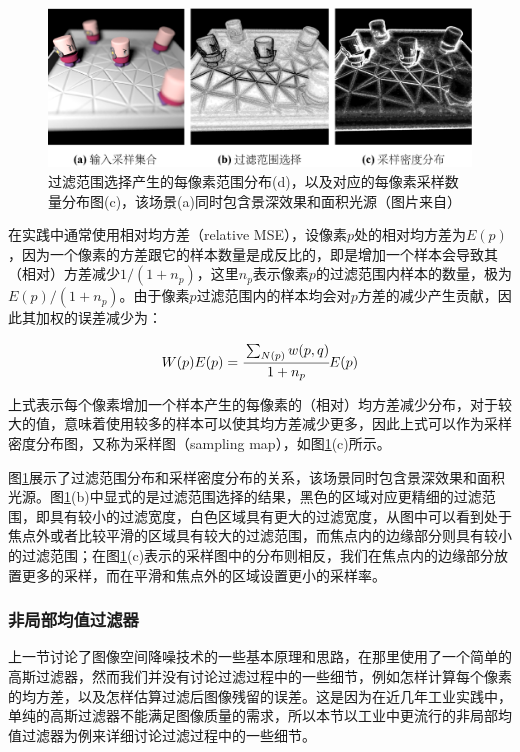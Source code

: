 \begin{figure}
	\includegraphics[width=1.0\textwidth]{figures/pt/denoising-results}
	\caption{过滤范围选择产生的每像素范围分布(d)，以及对应的每像素采样数量分布图(c)，该场景(a)同时包含景深效果和面积光源（图片来自\cite{a:AdaptiveRenderingaposteriorimethods}）}
	\label{f:pt-denoising-results}
\end{figure}

在实践中通常使用相对均方差（relative MSE），设像素$p$处的相对均方差为$E(p)$，因为一个像素的方差跟它的样本数量是成反比的，即是增加一个样本会导致其（相对）方差减少$1/(1+n_p)$，这里$n_p$表示像素$p$的过滤范围内样本的数量，极为$E(p)/(1+n_p)$。由于像素$p$过滤范围内的样本均会对$p$方差的减少产生贡献，因此其加权的误差减少为：

\begin{equation}
	W(p)E(p)= \cfrac{\sum\nolimits_{N(p)}w(p,q)}{1+n_p}E(p)
\end{equation}

\noindent 上式表示每个像素增加一个样本产生的每像素的（相对）均方差减少分布，对于较大的值，意味着使用较多的样本可以使其均方差减少更多，因此上式可以作为采样密度分布图，又称为采样图（sampling map），如图\ref{f:pt-denoising-results}(c)所示。

图\ref{f:pt-denoising-results}展示了过滤范围分布和采样密度分布的关系，该场景同时包含景深效果和面积光源。图\ref{f:pt-denoising-results}(b)中显式的是过滤范围选择的结果，黑色的区域对应更精细的过滤范围，即具有较小的过滤宽度，白色区域具有更大的过滤宽度，从图中可以看到处于焦点外或者比较平滑的区域具有较大的过滤范围，而焦点内的边缘部分则具有较小的过滤范围；在图\ref{f:pt-denoising-results}(c)表示的采样图中的分布则相反，我们在焦点内的边缘部分放置更多的采样，而在平滑和焦点外的区域设置更小的采样率。







\subsubsection{非局部均值过滤器 }\label{sec:pt-image-processing}
上一节讨论了图像空间降噪技术的一些基本原理和思路，在那里使用了一个简单的高斯过滤器，然而我们并没有讨论过滤过程中的一些细节，例如怎样计算每个像素的均方差，以及怎样估算过滤后图像残留的误差。这是因为在近几年工业实践中，单纯的高斯过滤器不能满足图像质量的需求，所以本节以工业中更流行的非局部均值过滤器为例来详细讨论过滤过程中的一些细节。

